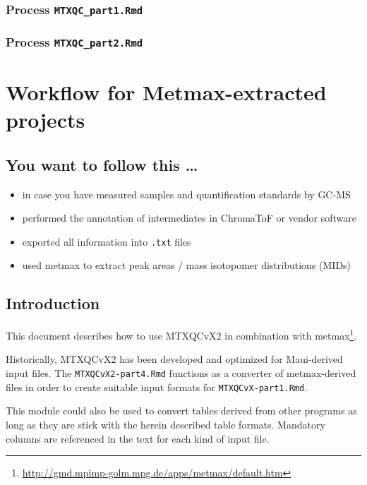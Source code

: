 \documentclass[]{book}
\providecommand{\tightlist}{%
  \setlength{\itemsep}{0pt}\setlength{\parskip}{0pt}}
\let\rmarkdownfootnote\footnote%
\def\footnote{\protect\rmarkdownfootnote}
\theoremstyle{definition}
\theoremstyle{definition}
\theoremstyle{definition}
\theoremstyle{remark}
\begin{document}
\subsection{\texorpdfstring{Process
\texttt{MTXQC\_part1.Rmd}}{Process MTXQC\_part1.Rmd}}\label{process-mtxqc_part1.rmd}

\subsection{\texorpdfstring{Process
\texttt{MTXQC\_part2.Rmd}}{Process MTXQC\_part2.Rmd}}\label{process-mtxqc_part2.rmd}

\chapter{Workflow for Metmax-extracted projects}\label{wf:metmax}

\section{You want to follow this
\ldots{}}\label{you-want-to-follow-this}

\begin{itemize}
\tightlist
\item
  in case you have measured samples and quantification standards by
  GC-MS
\item
  performed the annotation of intermediates in ChromaToF or vendor
  software
\item
  exported all information into \texttt{.txt} files
\item
  used metmax to extract peak areas / mass isotopomer distributions
  (MIDs)
\end{itemize}

\section{Introduction}\label{introduction}

This document describes how to use MTXQCvX2 in combination with
metmax\footnote{\url{http://gmd.mpimp-golm.mpg.de/apps/metmax/default.htm}}.

Historically, MTXQCvX2 has been developed and optimized for Maui-derived
input files. The \texttt{MTXQCvX2-part4.Rmd} functions as a converter of
metmax-derived files in order to create suitable input formats for
\texttt{MTXQCvX-part1.Rmd}.

This module could also be used to convert tables derived from other
programs as long as they are stick with the herein described table
formats. Mandatory columns are referenced in the text for each kind of
input file.
\end{document}
